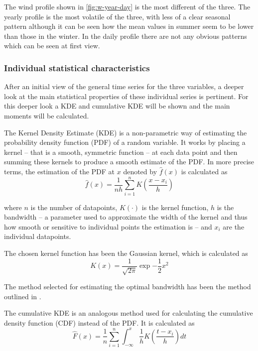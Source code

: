 The wind profile shown in \autoref{fig:w-year-day} is the most different of the three. The yearly profile is the most volatile of the three, with less of a clear seasonal pattern although it can be seen how the mean values in summer seem to be lower than those in the winter. In the daily profile there are not any obvious patterns which can be seen at first view. 

\subsubsection{Individual statistical characteristics}
After an initial view of the general time series for the three variables, a deeper look at the main statistical properties of these individual series is pertinent. For this deeper look a KDE and cumulative KDE will be shown and the main moments will be calculated. 

The Kernel Density Estimate (KDE) is a non-parametric way of estimating the probability density function (PDF) of a random variable. It works by placing a kernel -- that is a smooth, symmetric function -- at each data point and then summing these kernels to produce a smooth estimate of the PDF. In more precise terms, the estimation of the PDF at $x$ denoted by $\hat{f}\left(x\right)$ is calculated as
\begin{equation}
    \hat{f}\left(x\right)=\frac{1}{nh}\sum^n_{i=1}K\left(\frac{x-x_i}{h}\right)
\end{equation}

where $n$ is the number of datapoints, $K\left(\cdot\right)$ is the kernel function, $h$ is the bandwidth -- a parameter used to approximate the width of the kernel and thus how smooth or sensitive to individual points the estimation is -- and $x_i$ are the individual datapoints.

The chosen kernel function has been the Gaussian kernel, which is calculated as 
\begin{equation}
    K\left(x\right)=\frac{1}{\sqrt{2\pi}}\exp{-\frac{1}{2}x^2}
\end{equation}

The method selected for estimating the optimal bandwidth has been the method outlined in \cite{scott_1979}. 

The cumulative KDE is an analogous method used for calculating the cumulative density function (CDF) instead of the PDF. It is calculated as
\begin{equation}
    \label{eq:cumulative-kde}
    \hat{F}\left(x\right)=\frac{1}{n}\sum^n_{i=1}\int_{-\infty}^{x}\frac{1}{h}K\left(\frac{t-x_i}{h}\right)dt
\end{equation}

